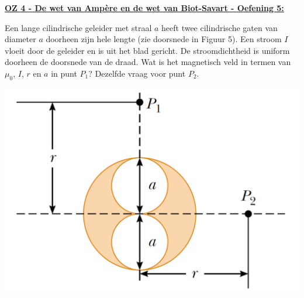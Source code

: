 \textbf{\underline{OZ 4 - De wet van Ampère en de wet van Biot-Savart - Oefening 5:}}
\vspace{0.5cm}



Een lange cilindrische geleider met straal $a$ heeft twee cilindrische gaten van diameter $a$ doorheen zijn hele lengte (zie doorsnede in Figuur 5). Een stroom $I$ vloeit door de geleider en is uit het blad gericht. De stroomdichtheid is uniform doorheen de doorsnede van de draad. Wat is het magnetisch veld in termen van $\mu_0$, $I$, $r$ en $a$ in punt $P_1$? Dezelfde vraag voor punt $P_2$.
    
\begin{center}
    \includegraphics[scale = 0.3]{oz04/resources/Oz4Oef5.png}
\end{center}

